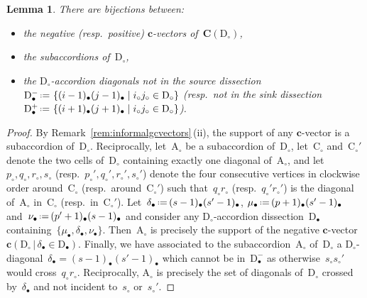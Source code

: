 \documentclass{amsart}
\newtheorem{lemma}[theorem]{Lemma}
\theoremstyle{definition}
\renewcommand{\b}[1]{\mathbf{#1}} %
\newcommand{\set}[2]{\left\{ #1 \;\middle|\; #2 \right\}} %
\newcommand{\eqdef}{\mbox{\,\raisebox{0.2ex}{\scriptsize\ensuremath{\mathrm:}}\ensuremath{=}\,}} %
\newcommand{\dissection}{\mathrm{D}} %
\newcommand{\cell}{\mathrm{C}} %
\newcommand{\accordion}{\mathrm{A}} %
\newcommand{\cvector}[3]{\mathbf{c}(#1  \,|\, #3 \in #2)} %
\newcommand{\allcvectors}[1]{\mathbf{C}(#1)} %
\newcommand{\mi}{-} %
\newcommand{\ma}{+} %
\begin{document}
\begin{lemma}
\label{lem:bijectioncvectors}
There are bijections between:
\begin{itemize}
\item the negative (resp.~positive) $\b{c}$-vectors of~$\allcvectors{\dissection_\circ}$,
\item the subaccordions of~$\dissection_\circ$,
\item the $\dissection_\circ$-accordion diagonals not in the source dissection~$\dissection_\bullet^\mi \eqdef \set{(i-1)_\bullet (j-1)_\bullet}{i_\circ j_\circ \in \dissection_\circ}$ (resp.~not in the sink dissection~$\dissection_\bullet^\ma \eqdef \set{(i+1)_\bullet (j+1)_\bullet}{i_\circ j_\circ \in \dissection_\circ}$).
\end{itemize}
\end{lemma}

\begin{proof}
By Remark~\ref{rem:informalgcvectors}\,(ii), the support of any $\b{c}$-vector is a subaccordion of~$\dissection_\circ$. Reciprocally, let~$\accordion_\circ$ be a subaccordion of~$\dissection_\circ$, let~$\cell_\circ$ and~$\cell_\circ'$ denote the two cells of~$\dissection_\circ$ containing exactly one diagonal of~$\accordion_\circ$, and let~$p_\circ, q_\circ, r_\circ, s_\circ$ (resp.~$p_\circ', q_\circ', r_\circ', s_\circ'$) denote the four consecutive vertices in clockwise order around~$\cell_\circ$ (resp.~around~$\cell_\circ'$) such that~$q_\circ r_\circ$ (resp.~$q_\circ' r_\circ'$) is the diagonal of~$\accordion_\circ$ in~$\cell_\circ$ (resp.~in~$\cell_\circ'$). Let~$\delta_\bullet \eqdef (s-1)_\bullet (s'-1)_\bullet$, ${\mu_\bullet \eqdef (p+1)_\bullet (s'-1)_\bullet}$ and~$\nu_\bullet \eqdef (p'+1)_\bullet (s-1)_\bullet$ and consider any $\dissection_\circ$-accordion dissection~$\dissection_\bullet$ containing~$\{\mu_\bullet, \delta_\bullet, \nu_\bullet\}$. Then~$\accordion_\circ$ is precisely the support of the negative $\b{c}$-vector~$\cvector{\dissection_\circ}{\dissection_\bullet}{\delta_\bullet}$. Finally, we have associated to the subaccordion~$\accordion_\circ$ of~$\dissection_\circ$ a $\dissection_\circ$-diagonal~$\delta_\bullet = (s-1)_\bullet (s'-1)_\bullet$ which cannot be in~$\dissection_\bullet^\mi$ as otherwise~$s_\circ s_\circ'$ would cross~$q_\circ r_\circ$. Reciprocally, $\accordion_\circ$ is precisely the set of diagonals of~$\dissection_\circ$ crossed by~$\delta_\bullet$ and not incident to~$s_\circ$ or~$s_\circ'$.
\end{proof}
\end{document}
